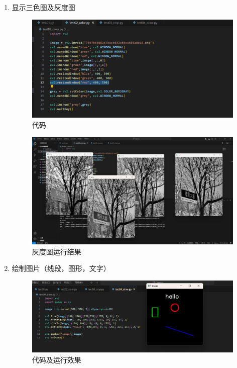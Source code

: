 \documentclass{ctexart}
\begin{document}
\begin{enumerate}
    \item 显示三色图及灰度图
    \begin{figure}[H]
        \centering
        \includegraphics[width=14cm]{f53ae908c9fa737a22919eca1122cd49.png}
        \caption{代码}
        \label{fig:1}
    \end{figure}
    \begin{figure}[H]
        \centering
        \includegraphics[width=14cm]{094f5864a7ce86daf98420c76f9ead6e.png}
        \caption{灰度图运行结果}
        \label{fig:1}
    \end{figure}
    \item 绘制图片（线段，图形，文字）
    \begin{figure}[H]
        \centering
        \includegraphics[width=14cm]{6c4f6d14ca5d99347b941438aaf626ac.png}
        \caption{代码及运行效果}
        \label{fig:1}
    \end{figure}
\end{enumerate}
\end{document}
